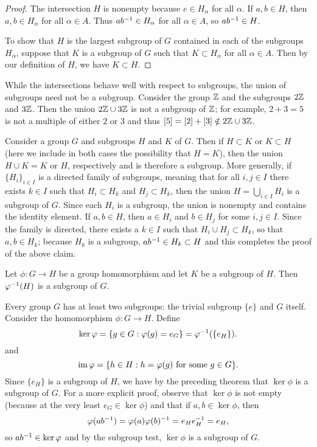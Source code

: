 \begin{proof}
    The intersection \(H\) is nonempty because \(e \in H_\alpha\) for all
    \(\alpha\). If \(a, b \in H\), then \(a, b \in H_\alpha\) for all \(\alpha
    \in A\). Thus \(ab^{-1} \in H_\alpha\) for all \(\alpha \in A\), so \(ab^{-1}
    \in H\).

    To show that \(H\) is the largest subgroup of \(G\) contained in each of the
    subgroups \(H_{\alpha}\), suppose that \(K\) is a subgroup of \(G\) such
    that \(K \subset H_{\alpha}\) for all \(\alpha \in A\). Then by our
    definition of \(H\), we have \(K \subset H\).
\end{proof}

\begin{example}
    While the intersections behave well with respect to subgroups, the union of
    subgroups need not be a subgroup. Consider the group \(\mathbb{Z}\) and the
    subgroups \(2\mathbb{Z}\) and \(3\mathbb{Z}\). Then the union \(2\mathbb{Z} \cup 3\mathbb{Z}\) is not a
    subgroup of \(\mathbb{Z}\); for example, \(2 + 3 = 5\) is not a multiple of either
    \(2\) or \(3\) and thus \([5] = [2] + [3] \notin 2\mathbb{Z} \cup 3\mathbb{Z}\).

    Consider a group \(G\) and subgroups \(H\) and \(K\) of \(G\). Then if \(H
    \subset K\) or \(K \subset H\) (here we include in both cases the
    possibility that \(H = K\)), then the union \(H \cup K = K\) or \(H\),
    respectively and is therefore a subgroup. More generally, if \(\{H_i\}_{i
    \in I}\) is a directed family of subgroups, meaning that for all \(i, j \in
    I\) there exists \(k \in I\) such that \(H_i \subset H_k\) and \(H_j \subset
    H_k\), then the union \(H = \bigcup_{i \in I} H_i\) is a subgroup of \(G\).
    Since each \(H_i\) is a subgroup, the union is nonempty and contains the
    identity element. If \(a, b \in H\), then \(a \in H_i\) and \(b \in H_j\)
    for some \(i, j \in I\). Since the family is directed, there exists a \(k \in
    I\) such that \(H_i \cup H_j \subset H_k\), so that \(a, b \in H_k\);
    because \(H_k\) is a subgroup, \(ab^{-1} \in H_k \subset H\) and this
    completes the proof of the above claim.
\end{example}

\begin{theorem}
    \label{thm:preimage-subgroup}
    Let \(\phi: G \to H\) be a group homomorphism and let \(K\) be a subgroup of
    \(H\). Then \(\varphi^{-1}(H)\) is a subgroup of \(G\).
\end{theorem}


Every group \(G\) has at least two subgroups: the trivial subgroup \(\{e\}\) and
\(G\) itself. Consider the homomorphism \(\phi: G \to H\). Define
\[
    \ker \varphi = \{g \in G : \varphi(g) = e_G\} = \varphi^{-1}(\{e_H\}).
\]
and
\[
    \operatorname{im} \varphi = \{h \in H : h = \varphi(g) \text{ for some } g \in G\}.
\]
Since \(\{e_H\}\) is a subgroup of \(H\), we have by the preceding theorem that
\(\ker \phi\) is a subgroup of \(G\). For a more explicit proof, observe that
\(\ker \phi\) is not empty (because at the very least \(e_G \in \ker \phi\)) and
that if \(a, b \in \ker \phi\), then 
\[
    \varphi(ab^{-1}) = \varphi(a)\varphi(b)^{-1} = e_H e_H^{-1} = e_H,
\]
so \(ab^{-1} \in \ker \varphi\) and by the subgroup test, \(\ker \phi\) is a
subgroup of \(G\).

